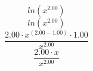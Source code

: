\documentclass{article}
\begin{document}
\begin{equation}
ln(x^{2.00})
\end{equation}
\begin{equation}
ln(x^{2.00})
\end{equation}
\begin{equation}
\frac{{2.00}\cdot x^({2.00}-{1.00})\cdot {1.00}}{x^{2.00}}
\end{equation}
\begin{equation}
\frac{{2.00}\cdot x}{x^{2.00}}
\end{equation}
\end{document}
